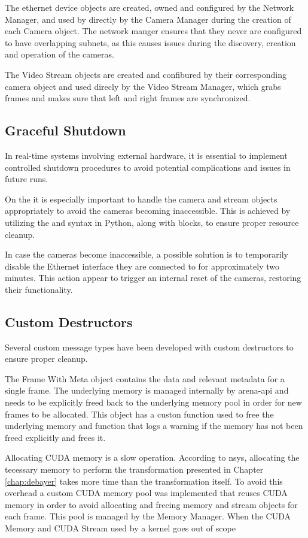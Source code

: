 The ethernet device objects are created, owned and configured by the Network Manager, and used by directly by the Camera Manager during the creation of each Camera object.
The network manger ensures that they never are configured to have overlapping subnets, as this causes issues during the discovery, creation and operation of the cameras.

The Video Stream objects are created and confibured by their corresponding camera object and used direcly by the Video Stream Manager, which grabs frames and makes sure that left and right frames are synchronized.

\subsection{Graceful Shutdown}
In real-time systems involving external hardware, it is essential to implement controlled shutdown procedures to avoid potential complications and issues in future runs.

On the \sr it is especially important to handle the camera and stream objects appropriately to avoid the cameras becoming inaccessible.
This is achieved by utilizing the  and  syntax in Python, along with  blocks, to ensure proper resource cleanup.

In case the cameras become inaccessible, a possible solution is to temporarily disable the Ethernet interface they are connected to for approximately two minutes.
This action appear to trigger an internal reset of the cameras, restoring their functionality.

\subsection{Custom Destructors}
Several custom message types have been developed with custom destructors to ensure proper cleanup.

The Frame With Meta object contains the data and relevant metadata for a single frame.
The underlying memory is managed internally by \gls{arena-api} and needs to be explicitly freed back to the underlying memory pool in order for new frames to be allocated.
This object has a custon  function used to free the underlying memory and  function that logs a warning if the memory has not been freed explicitly and frees it.

Allocating CUDA memory is a slow operation.
According to \gls{nsys}, allocating the tecessary memory to perform the transformation presented in Chapter \ref{chap:debayer} takes more time than the transformation itself.
To avoid this overhead a custom CUDA memory pool was implemented that reuses CUDA memory in order to avoid allocating and freeing memory and stream objects for each frame.
This pool is managed by the Memory Manager.
When the CUDA Memory and CUDA Stream used by a kernel goes out of scope

